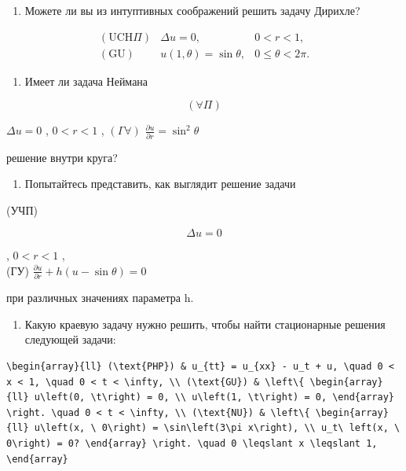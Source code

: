 \documentclass[
  ukrainian,
]{article}
\providecommand{\tightlist}{%
  \setlength{\itemsep}{0pt}\setlength{\parskip}{0pt}}
\begin{document}
\begin{enumerate}
\def\labelenumi{\arabic{enumi}.}
\tightlist
\item
  Можете ли вы из интуптивных соображений решить задачу Дирихле?
\end{enumerate}

\[
\begin{array}{ll} (\text{UCH}\Pi) & \Delta u = 0, & 0 < r < 1, \\ (\text{GU}) & u(1, \theta) = \sin \theta, & 0 \leqslant \theta < 2\pi. \end{array}
\]

\begin{enumerate}
\def\labelenumi{\arabic{enumi}.}
\setcounter{enumi}{1}
\tightlist
\item
  Имеет ли задача Неймана
\end{enumerate}

\[
(\forall \Pi)
\]

\(\Delta u = 0\) , \(0 < r < 1\) , \((\Gamma \forall)\)
\(\frac{\partial u}{\partial r} = \sin^2 \theta\)

решение внутри круга?

\begin{enumerate}
\def\labelenumi{\arabic{enumi}.}
\setcounter{enumi}{2}
\tightlist
\item
  Попытайтесь представить, как выглядит решение задачи
\end{enumerate}

(УЧП)

\[
\Delta u = 0
\]

, \(0 < r < 1\) ,\\
(ГУ) \(\frac{\partial u}{\partial r} + h(u - \sin \theta) = 0\)

при различных значениях параметра h.

\begin{enumerate}
\def\labelenumi{\arabic{enumi}.}
\setcounter{enumi}{3}
\tightlist
\item
  Какую краевую задачу нужно решить, чтобы найти стационарные решения
  следующей задачи:
\end{enumerate}

\begin{verbatim}
\begin{array}{ll} (\text{PHP}) & u_{tt} = u_{xx} - u_t + u, \quad 0 < x < 1, \quad 0 < t < \infty, \\ (\text{GU}) & \left\{ \begin{array}{ll} u\left(0, \t\right) = 0, \\ u\left(1, \t\right) = 0, \end{array} \right. \quad 0 < t < \infty, \\ (\text{NU}) & \left\{ \begin{array}{ll} u\left(x, \ 0\right) = \sin\left(3\pi x\right), \\ u_t\ left(x, \ 0\right) = 0? \end{array} \right. \quad 0 \leqslant x \leqslant 1, \end{array}
\end{verbatim}
\end{document}
